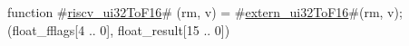 function #\hyperref[sailRISCVzriscvzyui32ToF16]{riscv\_ui32ToF16}# (rm, v) = {
  #\hyperref[sailRISCVzexternzyui32ToF16]{extern\_ui32ToF16}#(rm, v);
  (float_fflags[4 .. 0], float_result[15 .. 0])
}
